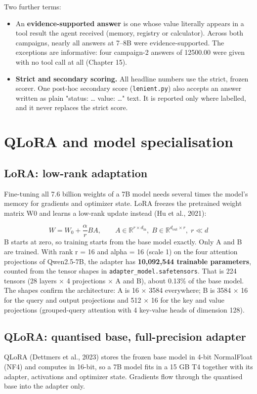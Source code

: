 \documentclass[10.5pt,a4paper,oneside]{report}
\begin{document}
Two further terms:

\begin{itemize}
\item An \textbf{evidence-supported answer} is one whose value literally appears in a tool result the agent received (memory, registry or calculator). Across both campaigns, nearly all answers at 7–8B were evidence-supported. The exceptions are informative: four campaign-2 answers of 12500.00 were given with no tool call at all (Chapter 15).
\item \textbf{Strict and secondary scoring.} All headline numbers use the strict, frozen scorer. One post-hoc secondary score (\texttt{lenient.\allowbreak{}py}) also accepts an answer written as plain "status: … value: …" text. It is reported only where labelled, and it never replaces the strict score.
\end{itemize}
\clearpage
\chapter{QLoRA and model specialisation}
\section{LoRA: low-rank adaptation}
Fine-tuning all 7.6 billion weights of a 7B model needs several times the model's memory for gradients and optimizer state. LoRA freezes the pretrained weight matrix W0 and learns a low-rank update instead (Hu et al., 2021):

\begin{equation*}W = W_0 + \frac{\alpha}{r} B A, \qquad A \in \mathbb{R}^{r \times d_{\mathrm{in}}},\; B \in \mathbb{R}^{d_{\mathrm{out}} \times r},\; r \ll d\end{equation*}
B starts at zero, so training starts from the base model exactly. Only A and B are trained. With rank r = 16 and alpha = 16 (scale 1) on the four attention projections of Qwen2.5-7B, the adapter has \textbf{10,092,544 trainable parameters}, counted from the tensor shapes in \texttt{adapter\_\allowbreak{}model.\allowbreak{}safetensors}. That is 224 tensors (28 layers × 4 projections × A and B), about 0.13\% of the base model. The shapes confirm the architecture: A is 16 × 3584 everywhere; B is 3584 × 16 for the query and output projections and 512 × 16 for the key and value projections (grouped-query attention with 4 key-value heads of dimension 128).

\section{QLoRA: quantised base, full-precision adapter}
QLoRA (Dettmers et al., 2023) stores the frozen base model in 4-bit NormalFloat (NF4) and computes in 16-bit, so a 7B model fits in a 15 GB T4 together with its adapter, activations and optimizer state. Gradients flow through the quantised base into the adapter only.
\end{document}
